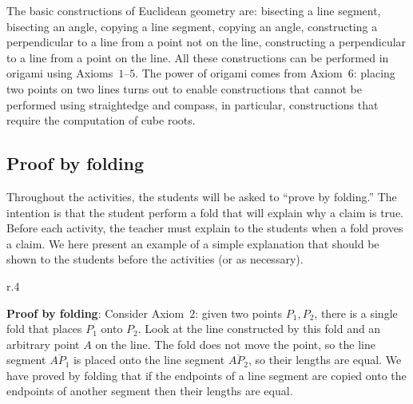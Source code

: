 The basic constructions of Euclidean geometry are: bisecting a line segment, bisecting an angle, copying a line segment, copying an angle, constructing a perpendicular to a line from a point not on the line, constructing a perpendicular to a line from a point on the line. All these constructions can be performed in origami using Axioms~$1$--$5$. The power of origami comes from Axiom~$6$: placing two points on two lines turns out to enable constructions that cannot be performed using straightedge and compass, in particular, constructions that require the computation of cube roots.

\subsection{Proof by folding}

Throughout the activities, the students will be asked to ``prove by folding.'' The intention is that the student perform a fold that will explain why a claim is true. Before each activity, the teacher must explain to the students when a fold proves a claim. We here present an example of a simple explanation that should be shown to the students before the activities (or as necessary).

\begin{wrapfigure}{r}{.4\textwidth}
\begin{center}
\vspace{-4ex}
\end{center}	
\end{wrapfigure}
\textbf{Proof by folding}: Consider Axiom~$2$: given two points $P_1,P_2$, there is a single fold that places $P_1$ onto $P_2$. Look at the line constructed by this fold and an arbitrary point $A$ on the line. The fold does not move the point, so the line segment $\overline{AP_1}$ is placed onto the line segment $\overline{AP_2}$, so their lengths are equal. We have proved by folding that if the endpoints of a line segment are copied onto the endpoints of another segment then their lengths are equal.


